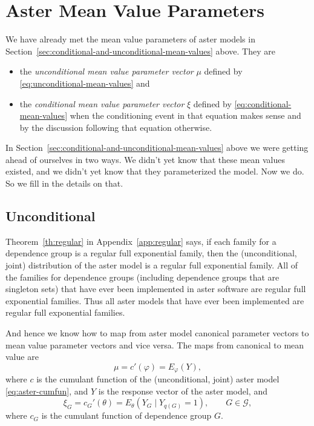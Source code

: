 \section{Aster Mean Value Parameters}
\label{sec:aster-mean-value-parameters}

We have already met the mean value parameters of aster models in
Section~\ref{sec:conditional-and-unconditional-mean-values} above.
They are
\begin{itemize}
\item the \emph{unconditional mean value parameter vector} $\mu$ defined by
\eqref{eq:unconditional-mean-values} and
\item the \emph{conditional mean value parameter vector} $\xi$ defined by
\eqref{eq:conditional-mean-values} when the conditioning event in that
equation makes sense and by the discussion following that equation otherwise.
\end{itemize}

In Section~\ref{sec:conditional-and-unconditional-mean-values} above
we were getting ahead of ourselves in two ways.  We didn't yet know
that these mean values existed, and we didn't yet know that they
parameterized the model.  Now we do.  So we fill in the details on that.

\subsection{Unconditional}

Theorem~\ref{th:regular} in Appendix~\ref{app:regular} says, if each
family for a dependence group is a regular full exponential family,
then the (unconditional, joint) distribution of the aster model is
a regular full exponential family.  All of the families for dependence
groups (including dependence groups that are singleton sets) that
have ever been implemented in aster software are regular full exponential
families.
Thus all aster models that have ever been implemented are
regular full exponential families.

And hence we know how to map from aster model canonical parameter vectors
to mean value parameter vectors and vice versa.  The maps from canonical
to mean value are
\begin{equation} \label{eq:aster-phi-to-mu}
   \mu = c'(\varphi) = E_\varphi(Y),
\end{equation}
where $c$ is the cumulant function of the (unconditional, joint) aster
model \eqref{eq:aster-cumfun}, and $Y$ is the response vector of the
aster model, and
\begin{equation} \label{eq:aster-theta-to-xi}
   \xi_G = c_G'(\theta) = E_\theta(Y_G \mid Y_{q(G)} = 1),
   \qquad G \in \mathcal{G},
\end{equation}
where $c_G$ is the cumulant function of dependence group $G$.

